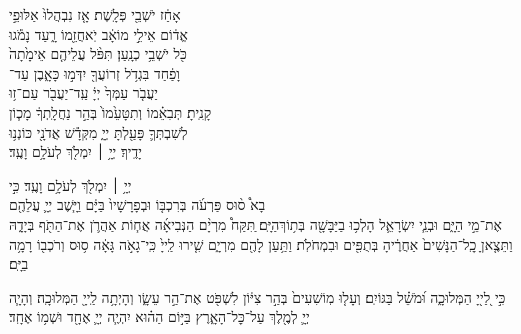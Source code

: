 \documentclass[twoside, openany, parskip=half, 11pt]{book}
\begin{document}
אָחַ֔ז יֹשְׁבֵ֖י פְּלָֽשֶׁת׃ \hfill אָ֤ז נִבְהֲלוּ֙ אַלּוּפֵ֣י \\
אֱד֔וֹם \hfill אֵילֵ֣י מוֹאָ֔ב יֹֽאחֲזֵ֖מוֹ רָ֑עַד \hfill נָמֹ֕גוּ \\
כֹּ֖ל יֹשְׁבֵ֥י כְנָֽעַן׃ \hfill תִּפֹּ֨ל עֲלֵיהֶ֤ם אֵימָ֙תָה֙ \\
וָפַ֔חַד \hfill בִּגְדֹ֥ל זְרוֹעֲךָ֖ יִדְּמ֣וּ כָּאָ֑בֶן \hfill עַד־\\
יַעֲבֹ֤ר עַמְּךָ֙ יְיָ֔ \hfill עַֽד־יַעֲבֹ֖ר עַם־ז֥וּ \\
קָנִֽיתָ׃ \hfill תְּבִאֵ֗מוֹ וְתִטָּעֵ֙מוֹ֙ בְּהַ֣ר נַחֲלָֽתְךָ֔ \hfill מָכ֧וֹן \\
לְשִׁבְתְּךָ֛ פָּעַ֖לְתָּ יְיָ֑ \hfill מִקְּדָ֕שׁ אֲדֹנָ֖י כּוֹנְנ֥וּ \\
יָדֶֽיךָ׃ \hfill יְיָ֥ ׀ יִמְלֹ֖ךְ לְעֹלָ֥ם וָעֶֽד׃\hfill \break
\begin{small}
\hfill יְיָ֥ ׀ יִמְלֹ֖ךְ לְעֹלָ֥ם וָעֶֽד׃ \hfill כִּ֣י \\
בָא֩ ס֨וּס פַּרְעֹ֜ה בְּרִכְבּ֤וֹ וּבְפָרָשָׁיו֙ בַּיָּ֔ם \hfill וַיָּ֧שֶׁב יְיָ֛ עֲלֵהֶ֖ם \\
אֶת־מֵ֣י הַיָּ֑ם \hfill וּבְנֵ֧י יִשְׂרָאֵ֛ל הָלְכ֥וּ בַיַּבָּשָׁ֖ה בְּת֥וֹךְ\hfill הַיָּֽם׃ 
ַתִּקַּח֩ מִרְיָ֨ם הַנְּבִיאָ֜ה אֲח֧וֹת אַהֲרֹ֛ן אֶת־הַתֹּ֖ף בְּיָדָ֑הּ וַתֵּצֶ֤אןָ כׇֽל־הַנָּשִׁים֙ אַחֲרֶ֔יהָ בְּתֻפִּ֖ים וּבִמְחֹלֹֽת׃ וַתַּ֥עַן לָהֶ֖ם מִרְיָ֑ם שִׁ֤ירוּ לַֽייָ֙ כִּֽי־גָאֹ֣ה גָּאָ֔ה ס֥וּס וְרֹכְב֖וֹ רָמָ֥ה בַיָּֽם׃\end{small}


כִּ֣י לַ֭ייָ֭ הַמְּלוּכָ֑ה וּ֝מֹשֵׁ֗ל בַּגּוֹיִֽם׃
וְעָל֤וּ מֽוֹשִׁעִים֙ בְּהַ֣ר צִיּ֔וֹן לִשְׁפֹּ֖ט אֶת־הַ֣ר עֵשָׂ֑ו וְהָיְתָ֥ה לַֽייָ֖ הַמְּלוּכָֽה׃
וְהָיָ֧ה יְיָ֛ לְמֶ֖לֶךְ עַל־כׇּל־הָאָ֑רֶץ בַּיּ֣וֹם הַה֗וּא יִהְיֶ֧ה יְיָ֛ אֶחָ֖ד וּשְׁמ֥וֹ אֶחָֽד׃
\end{document}
